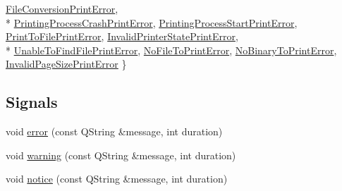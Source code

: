 \begin{DoxyCompactItemize}
\hyperlink{classOkular_1_1Generator_a43266d4eb3e7929924dd10ea53bc1d61aec9027f4e5cfdae52f83de14e52dde41}{File\+Conversion\+Print\+Error}, 
\\*
\hyperlink{classOkular_1_1Generator_a43266d4eb3e7929924dd10ea53bc1d61a4888a7455baba78b6f8cfe351956ba5e}{Printing\+Process\+Crash\+Print\+Error}, 
\hyperlink{classOkular_1_1Generator_a43266d4eb3e7929924dd10ea53bc1d61a2266cdd2bd6a63a77c566cd49e73839f}{Printing\+Process\+Start\+Print\+Error}, 
\hyperlink{classOkular_1_1Generator_a43266d4eb3e7929924dd10ea53bc1d61a0730ff074dea39b2f31be7d33812918a}{Print\+To\+File\+Print\+Error}, 
\hyperlink{classOkular_1_1Generator_a43266d4eb3e7929924dd10ea53bc1d61ae485c9d2113f08df22f841cdec5a6916}{Invalid\+Printer\+State\+Print\+Error}, 
\\*
\hyperlink{classOkular_1_1Generator_a43266d4eb3e7929924dd10ea53bc1d61a53237e1ad4d6e5145e29604834057b59}{Unable\+To\+Find\+File\+Print\+Error}, 
\hyperlink{classOkular_1_1Generator_a43266d4eb3e7929924dd10ea53bc1d61ae954cba05c7a5435588cf0ed29e2a890}{No\+File\+To\+Print\+Error}, 
\hyperlink{classOkular_1_1Generator_a43266d4eb3e7929924dd10ea53bc1d61aa872427640e4ae32edc173645f3673d9}{No\+Binary\+To\+Print\+Error}, 
\hyperlink{classOkular_1_1Generator_a43266d4eb3e7929924dd10ea53bc1d61a48f3e94e2e31e0b7d7d8d40bcc25f504}{Invalid\+Page\+Size\+Print\+Error}
 \}
\end{DoxyCompactItemize}
\subsection*{Signals}
\begin{DoxyCompactItemize}
\item 
void \hyperlink{classOkular_1_1Generator_a0f73eaeb88ccb1ecb73814a918244e03}{error} (const Q\+String \&message, int duration)
\item 
void \hyperlink{classOkular_1_1Generator_aff0b69c430b30d0e0bf820015ba0a79d}{warning} (const Q\+String \&message, int duration)
\item 
void \hyperlink{classOkular_1_1Generator_a3a0ac65f0d61abbaa86b79b258bbe3b3}{notice} (const Q\+String \&message, int duration)
\end{DoxyCompactItemize}
